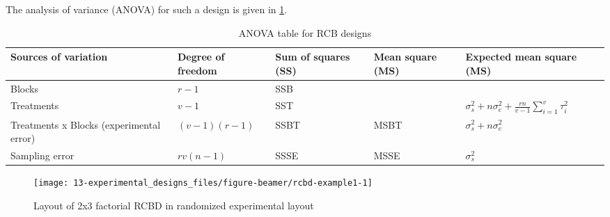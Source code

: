 \documentclass[
  ignorenonframetext,
  aspectratio=169]{beamer}
\begin{document}
\begin{frame}{}
\protect\hypertarget{section-4}{}
The analysis of variance (ANOVA) for such a design is given in
\ref{tab:anova-rcbd-template}.

\begin{table}

\caption{\label{tab:anova-rcbd-template}ANOVA table for RCB designs}
\centering
\fontsize{8}{10}\selectfont
\begin{tabular}[t]{>{\raggedright\arraybackslash}p{6em}>{\raggedright\arraybackslash}p{5em}>{\raggedright\arraybackslash}p{5em}>{\raggedright\arraybackslash}p{5em}>{\raggedright\arraybackslash}p{8em}}
\toprule
Sources of variation & Degree of freedom & Sum of squares (SS) & Mean square (MS) & Expected mean square (MS)\\
\midrule
Blocks & $r - 1$ & SSB &  & \\
Treatments & $v-1$ & SST &  & $\sigma_s^2 + n \sigma_e^2 + \frac{rn}{v-1} \sum_{i = 1}^v \tau_i^2$\\
Treatments x Blocks (experimental error) & $(v-1)(r-1)$ & SSBT & MSBT & $\sigma_s^2 + n \sigma_e^2$\\
Sampling error & $rv(n-1)$ & SSSE & MSSE & $\sigma_s^2$\\
\bottomrule
\end{tabular}
\end{table}
\end{frame}

\begin{frame}{}
\protect\hypertarget{section-5}{}
\begin{figure}
\texttt{[image: 13-experimental\_designs\_files/figure-beamer/rcbd-example1-1]} \caption{Layout of 2x3 factorial RCBD in randomized experimental layout}\label{fig:rcbd-example1}
\end{figure}
\end{frame}
\end{document}
